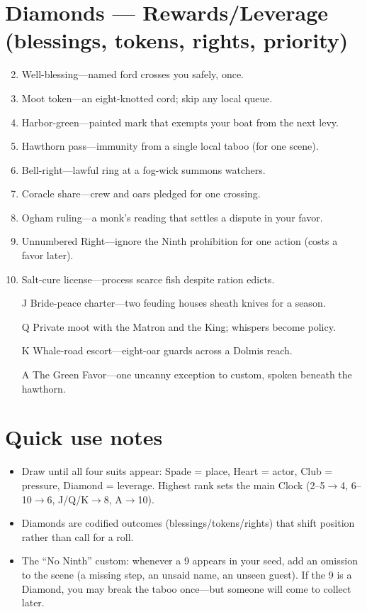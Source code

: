\section*{Diamonds --- Rewards/Leverage (blessings, tokens, rights, priority)}
\begin{enumerate}
\setcounter{enumi}{1}
\item Well-blessing---named ford crosses you safely, once.
\item Moot token---an eight-knotted cord; skip any local queue.
\item Harbor-green---painted mark that exempts your boat from the next levy.
\item Hawthorn pass---immunity from a single local taboo (for one scene).
\item Bell-right---lawful ring at a fog-wick summons watchers.
\item Coracle share---crew and oars pledged for one crossing.
\item Ogham ruling---a monk's reading that settles a dispute in your favor.
\item Unnumbered Right---ignore the Ninth prohibition for one action (costs a favor later).
\item Salt-cure license---process scarce fish despite ration edicts.
\item[J] Bride-peace charter---two feuding houses sheath knives for a season.
\item[Q] Private moot with the Matron and the King; whispers become policy.
\item[K] Whale-road escort---eight-oar guards across a Dolmis reach.
\item[A] The Green Favor---one uncanny exception to custom, spoken beneath the hawthorn.
\end{enumerate}

\section*{Quick use notes}
\begin{itemize}
\item Draw until all four suits appear: Spade = place, Heart = actor, Club = pressure, Diamond = leverage. Highest rank sets the main Clock (2--5$\rightarrow$4, 6--10$\rightarrow$6, J/Q/K$\rightarrow$8, A$\rightarrow$10).
\item Diamonds are codified outcomes (blessings/tokens/rights) that shift position rather than call for a roll.
\item The ``No Ninth'' custom: whenever a 9 appears in your seed, add an omission to the scene (a missing step, an unsaid name, an unseen guest). If the 9 is a Diamond, you may break the taboo once---but someone will come to collect later.
\end{itemize}

